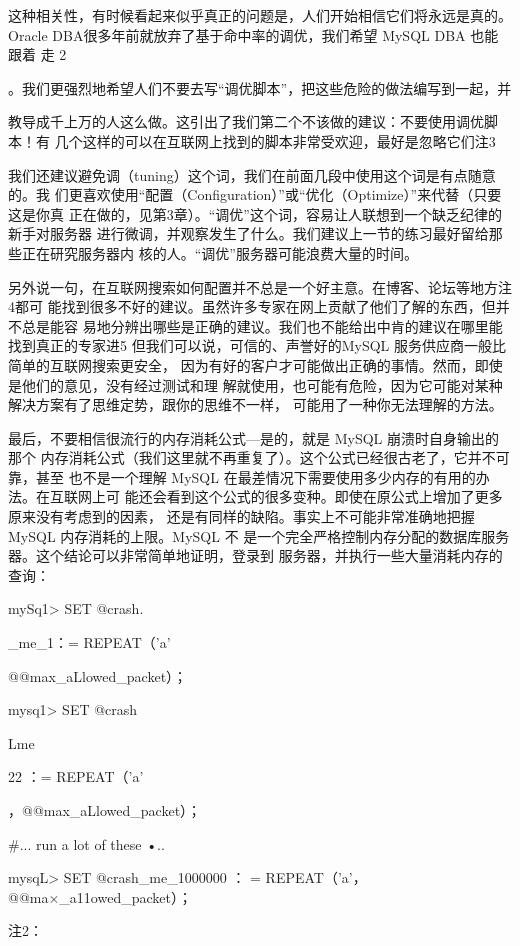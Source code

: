 这种相关性，有时候看起来似乎真正的问题是，人们开始相信它们将永远是真的。
Oracle DBA很多年前就放弃了基于命中率的调优，我们希望 MySQL DBA 也能跟着
走 2

。我们更强烈地希望人们不要去写“调优脚本”，把这些危险的做法编写到一起，并

教导成千上万的人这么做。这引出了我们第二个不该做的建议：不要使用调优脚本！有
几个这样的可以在互联网上找到的脚本非常受欢迎，最好是忽略它们注3

我们还建议避免调（tuning）这个词，我们在前面几段中使用这个词是有点随意的。我
们更喜欢使用“配置（Configuration）”或“优化（Optimize）”来代替（只要这是你真
正在做的，见第3章）。“调优”这个词，容易让人联想到一个缺乏纪律的新手对服务器
进行微调，并观察发生了什么。我们建议上一节的练习最好留给那些正在研究服务器内
核的人。“调优”服务器可能浪费大量的时间。

另外说一句，在互联网搜索如何配置并不总是一个好主意。在博客、论坛等地方注4都可
能找到很多不好的建议。虽然许多专家在网上贡献了他们了解的东西，但并不总是能容
易地分辨出哪些是正确的建议。我们也不能给出中肯的建议在哪里能找到真正的专家进5
但我们可以说，可信的、声誉好的MySQL 服务供应商一般比简单的互联网搜索更安全，
因为有好的客户才可能做出正确的事情。然而，即使是他们的意见，没有经过测试和理
解就使用，也可能有危险，因为它可能对某种解决方案有了思维定势，跟你的思维不一样，
可能用了一种你无法理解的方法。

最后，不要相信很流行的内存消耗公式—是的，就是 MySQL 崩溃时自身输出的那个
内存消耗公式（我们这里就不再重复了）。这个公式已经很古老了，它并不可靠，甚至
也不是一个理解 MySQL 在最差情况下需要使用多少内存的有用的办法。在互联网上可
能还会看到这个公式的很多变种。即使在原公式上增加了更多原来没有考虑到的因素，
还是有同样的缺陷。事实上不可能非常准确地把握MySQL 内存消耗的上限。MySQL 不
是一个完全严格控制内存分配的数据库服务器。这个结论可以非常简单地证明，登录到
服务器，并执行一些大量消耗内存的查询：

mySq1> SET @crash.

\_me\_1：= REPEAT（'a'

@@max\_aLlowed\_packet）；

mysq1> SET @crash

Lme

22 ：= REPEAT（'a'

，@@max\_aLlowed\_packet）；

#... run a lot of these •..

mysqL> SET @crash\_me\_1000000 ： = REPEAT（'a'，@@ma×\_a11owed\_packet）；

注2：

